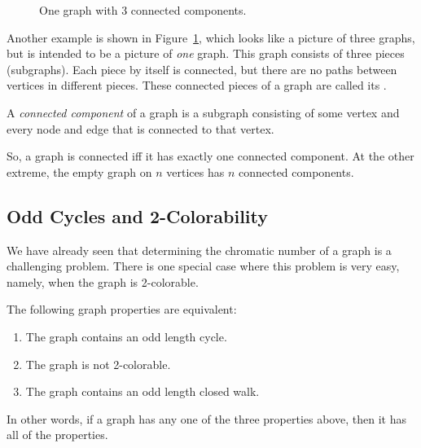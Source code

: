 \begin{figure}[htbp]


\caption{One graph with 3 connected components.}

\label{fig:3comp}
\end{figure}

Another example is shown in Figure~\ref{fig:3comp}, which looks like a
picture of three graphs, but is intended to be a picture of \emph{one}
graph.  This graph consists of three pieces (subgraphs).  Each piece
by itself is connected, but there are no paths between vertices in
different pieces.  These connected pieces of a graph are called its
.

\begin{definition}\label{def:connected-component}
A \emph{connected component} of a graph is a subgraph consisting of
some vertex and every node and edge that is connected to that vertex.
\end{definition}

So, a graph is connected iff it has exactly one connected component.
At the other extreme, the empty graph on $n$ vertices has $n$
connected components.


\subsection{Odd Cycles and 2-Colorability}\label{subsec:odd_cycles}

We have already seen that determining the chromatic number of a graph is a
challenging problem.  There is one special case where this problem is very
easy, namely, when the graph is 2-colorable.

\begin{theorem}\label{thm:2-colorable-equiv}
The following graph properties are equivalent:

\begin{enumerate}

\item\label{has-odd-cycle}
The graph contains an odd length cycle.

\item\label{not-2-color}
The graph is not 2-colorable.

\item\label{has-odd-closed-walk}
The graph contains an odd length closed walk.

\end{enumerate}
\end{theorem}
In other words, if a graph has any one of the three properties above, then
it has all of the properties.

